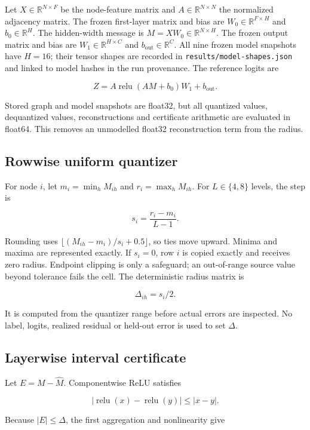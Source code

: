 \documentclass{article}
\begin{document}
Let \(X\in\mathbb R^{N\times F}\) be the node-feature matrix and \(A\in\mathbb R^{N\times N}\) the normalized adjacency matrix. The frozen first-layer matrix and bias are \(W_0\in\mathbb R^{F\times H}\) and \(b_0\in\mathbb R^H\). The hidden-width message is \(M=XW_0\in\mathbb R^{N\times H}\). The frozen output matrix and bias are \(W_1\in\mathbb R^{H\times C}\) and \(b_{\mathrm{out}}\in\mathbb R^C\). All nine frozen model snapshots have \(H=16\); their tensor shapes are recorded in \texttt{results/model-shapes.json} and linked to model hashes in the run provenance. The reference logits are

\[
Z=A\operatorname{relu}(AM+b_0)W_1+b_{\mathrm{out}}.
\]

Stored graph and model snapshots are float32, but all quantized values, dequantized values, reconstructions and certificate arithmetic are evaluated in float64. This removes an unmodelled float32 reconstruction term from the radius.

\subsection{Rowwise uniform quantizer}


For node \(i\), let \(m_i=\min_h M_{ih}\) and \(r_i=\max_h M_{ih}\). For \(L\in\{4,8\}\) levels, the step is

\[
s_i=\frac{r_i-m_i}{L-1}.
\]

Rounding uses \(\lfloor (M_{ih}-m_i)/s_i+0.5\rfloor\), so ties move upward. Minima and maxima are represented exactly. If \(s_i=0\), row \(i\) is copied exactly and receives zero radius. Endpoint clipping is only a safeguard; an out-of-range source value beyond tolerance fails the cell. The deterministic radius matrix is

\[
\Delta_{ih}=s_i/2.
\]

It is computed from the quantizer range before actual errors are inspected. No label, logits, realized residual or held-out error is used to set \(\Delta\).

\subsection{Layerwise interval certificate}


Let \(E=M-\widehat M\). Componentwise ReLU satisfies

\[
|\operatorname{relu}(x)-\operatorname{relu}(y)|\le |x-y|.
\]

Because \(|E|\le\Delta\), the first aggregation and nonlinearity give
\end{document}
